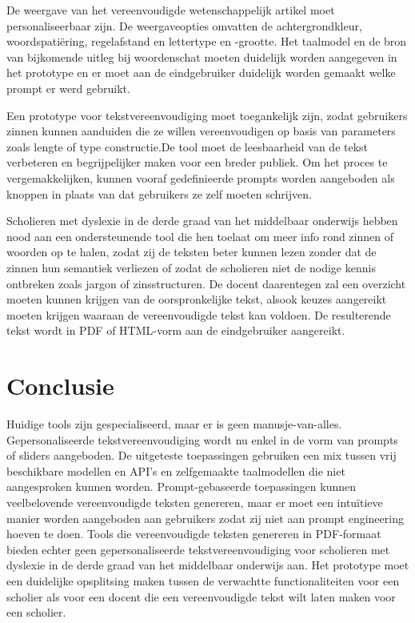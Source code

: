 De weergave van het vereenvoudigde wetenschappelijk artikel moet personaliseerbaar zijn. De weergaveopties omvatten de achtergrondkleur, woordspatiëring, regelafstand en lettertype en -grootte. Het taalmodel en de bron van bijkomende uitleg bij woordenschat moeten duidelijk worden aangegeven in het prototype en er moet aan de eindgebruiker duidelijk worden gemaakt welke prompt er werd gebruikt. 

Een prototype voor tekstvereenvoudiging moet toegankelijk zijn, zodat gebruikers zinnen kunnen aanduiden die ze willen vereenvoudigen op basis van parameters zoals lengte of type constructie.De tool moet de leesbaarheid van de tekst verbeteren en begrijpelijker maken voor een breder publiek. Om het proces te vergemakkelijken, kunnen vooraf gedefinieerde prompts worden aangeboden als knoppen in plaats van dat gebruikers ze zelf moeten schrijven. 

Scholieren met dyslexie in de derde graad van het middelbaar onderwijs hebben nood aan een ondersteunende tool die hen toelaat om meer info rond zinnen of woorden op te halen, zodat zij de teksten beter kunnen lezen zonder dat de zinnen hun semantiek verliezen of zodat de scholieren niet de nodige kennis ontbreken zoals jargon of zinsstructuren. De docent daarentegen zal een overzicht moeten kunnen krijgen van de oorspronkelijke tekst, alsook keuzes aangereikt moeten krijgen waaraan de vereenvoudigde tekst kan voldoen. De resulterende tekst wordt in PDF of HTML-vorm aan de eindgebruiker aangereikt.

\section{Conclusie}

Huidige tools zijn gespecialiseerd, maar er is geen manusje-van-alles. Gepersonaliseerde tekstvereenvoudiging wordt nu enkel in de vorm van prompts of sliders aangeboden. De uitgeteste toepassingen gebruiken een mix tussen vrij beschikbare modellen en API's en zelfgemaakte taalmodellen die niet aangesproken kunnen worden. Prompt-gebaseerde toepassingen kunnen veelbelovende vereenvoudigde teksten genereren, maar er moet een intuïtieve manier worden aangeboden aan gebruikers zodat zij niet aan prompt engineering hoeven te doen. Tools die vereenvoudigde teksten genereren in PDF-formaat bieden echter geen gepersonaliseerde tekstvereenvoudiging voor scholieren met dyslexie in de derde graad van het middelbaar onderwijs aan. Het prototype moet een duidelijke opsplitsing maken tussen de verwachtte functionaliteiten voor een scholier als voor een docent die een vereenvoudigde tekst wilt laten maken voor een scholier.


